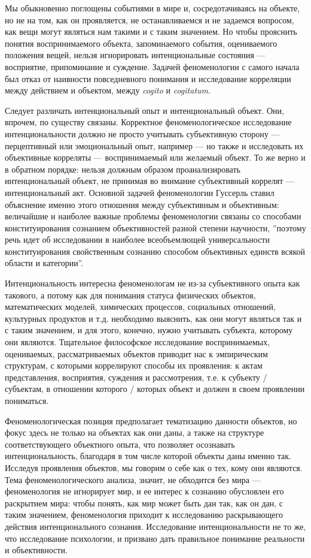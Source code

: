 \documentclass[11pt]{book}
\begin{document}
Мы обыкновенно поглощены событиями в мире и, сосредотачиваясь на объекте, но не на том, как он проявляется, не останавливаемся и не задаемся вопросом, как вещи могут являться нам такими и с таким значением. Но чтобы прояснить понятия воспринимаемого объекта, запоминаемого события, оцениваемого положения вещей, нельзя игнорировать интенциональные состояния --- восприятие, припоминание и суждение. Задачей феноменологии с самого начала был отказ от наивности повседневного понимания и исследование корреляции между действием и объектом, между \textit{cogito} и \textit{cogitatum}.

Следует различать интенциональный опыт и интенциональный объект. Они, впрочем, по существу связаны. Корректное феноменологическое исследование интенциональности должно не просто учитывать субъективную сторону --- перцептивный или эмоциональный опыт, например --- но также и исследовать их объективные корреляты --- воспринимаемый или желаемый объект. То же верно и в обратном порядке: нельзя должным образом проанализировать интенциональный объект, не принимая во внимание субъективный коррелят --- интенциональный акт. Основной задачей феноменологии Гуссерль ставил объяснение именно этого отношения между субъективным и объективным: величайшие и наиболее важные проблемы феноменологии связаны со способами конституирования сознанием объективностей разной степени научности, ''поэтому речь идет об исследовании в наиболее всеобъемлющей универсальности конституирования свойственным сознанию способом объективных единств всякой области и категории''.

Интенциональность интересна феноменологам не из-за субъективного опыта как такового, а потому как для понимания статуса физических объектов, математических моделей, химических процессов, социальных отношений, культурных продуктов и т.д. необходимо выяснить, как они могут являться так и с таким значением, и для этого, конечно, нужно учитывать субъекта, которому они являются. Тщательное философское исследование воспринимаемых, оцениваемых, рассматриваемых объектов приводит нас к эмпирическим структурам, с которыми коррелируют способы их проявления: к актам представления, восприятия, суждения и рассмотрения, т.е. к субъекту / субъектам, в отношении которого / которых объект и должен в своем проявлении пониматься.

Феноменологическая позиция предполагает тематизацию данности объектов, но фокус здесь не только на объектах как они даны, а также на структуре соответствующего объектного опыта, что позволяет осознавать интенциональность, благодаря в том числе которой объекты даны именно так. Исследуя проявления объектов, мы говорим о себе как о тех, кому они являются. Тема феноменологического анализа, значит, не обходится без мира --- феноменология не игнорирует мир, и ее интерес к сознанию обусловлен его раскрытием мира: чтобы понять, как мир может быть дан так, как он дан, с таким значением, феноменология приходит к исследованию раскрывающего действия интенционального сознания. Исследование интенциональности не то же, что исследование психологии, и призвано дать правильное понимание реальности и объективности.
\end{document}
